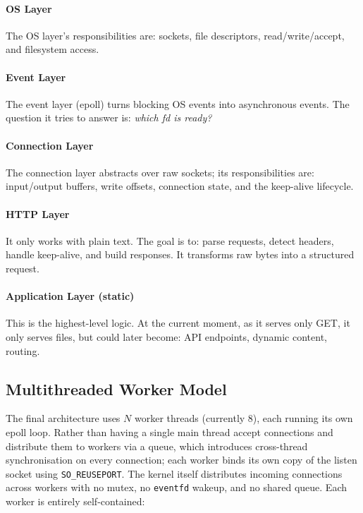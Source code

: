 \documentclass{article}
\begin{document}
\paragraph{OS Layer} The OS layer's responsibilities are: sockets, file descriptors,
read/write/accept, and filesystem access.

\paragraph{Event Layer} The event layer (epoll) turns blocking OS events into asynchronous
events. The question it tries to answer is: \emph{which fd is ready?}

\paragraph{Connection Layer} The connection layer abstracts over raw sockets; its
responsibilities are: input/output buffers, write offsets, connection state, and the
keep-alive lifecycle.

\paragraph{HTTP Layer} It only works with plain text. The goal is to: parse requests,
detect headers, handle keep-alive, and build responses. It transforms raw bytes into a
structured request.

\paragraph{Application Layer (static)} This is the highest-level logic. At the current
moment, as it serves only GET, it only serves files, but could later become: API endpoints,
dynamic content, routing.

\subsection{Multithreaded Worker Model}

The final architecture uses $N$ worker threads (currently 8), each running its own epoll
loop. Rather than having a single main thread accept connections and distribute them to
workers via a queue, which introduces cross-thread synchronisation on every connection;
each worker binds its own copy of the listen socket using \texttt{SO\_REUSEPORT}. The kernel
itself distributes incoming connections across workers with no mutex, no \texttt{eventfd}
wakeup, and no shared queue. Each worker is entirely self-contained:
\end{document}
